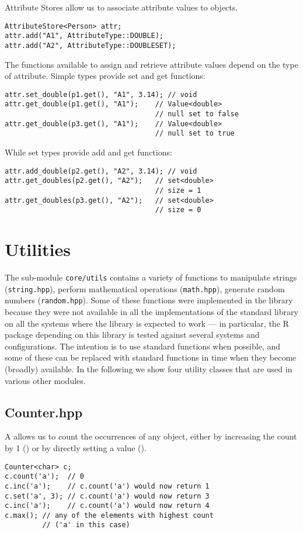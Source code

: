 Attribute Stores allow us to associate attribute values to objects.
\begin{lstlisting}[style=c++]
AttributeStore<Person> attr;
attr.add("A1", AttributeType::DOUBLE);
attr.add("A2", AttributeType::DOUBLESET);
\end{lstlisting}
The functions available to assign and retrieve attribute values depend on the type of attribute. Simple types provide set and get functions:
\begin{lstlisting}[style=c++]
attr.set_double(p1.get(), "A1", 3.14); // void
attr.get_double(p1.get(), "A1");    // Value<double>
                                    // null set to false
attr.get_double(p3.get(), "A1");    // Value<double>
                                    // null set to true
\end{lstlisting}
While set types provide add and get functions:
\begin{lstlisting}[style=c++]
attr.add_double(p2.get(), "A2", 3.14); // void
attr.get_doubles(p2.get(), "A2");   // set<double>
                                    // size = 1
attr.get_doubles(p3.get(), "A2");   // set<double>
                                    // size = 0
\end{lstlisting}

\section{Utilities}

The sub-module \texttt{core/utils} contains a variety of functions to manipulate strings (\texttt{string.hpp}), perform mathematical operations (\texttt{math.hpp}), generate random numbers (\texttt{random.hpp}). Some of these functions were implemented in the library because they were not available in all the implementations of the standard library on all the systems where the library is expected to work --- in particular, the R package depending on this library is tested against several systems and configurations. The intention is to use standard functions when possible, and some of these can be replaced with standard functions in time when they become (broadly) available. In the following we show four utility classes that are used in various other modules.


\subsection{Counter.hpp}

A  allows us to count the occurrences of any object, either by increasing the count by 1 () or by directly setting a value ().
\begin{lstlisting}[style=c++]
Counter<char> c;
c.count('a');  // 0
c.inc('a');    // c.count('a') would now return 1
c.set('a', 3); // c.count('a') would now return 3
c.inc('a');    // c.count('a') would now return 4
c.max(); // any of the elements with highest count 
         // ('a' in this case)
\end{lstlisting}


